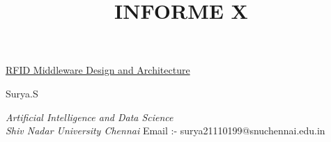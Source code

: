 \documentclass[a4paper,12pt]{article}
\title{INFORME X}
\begin{document}
\begin{center}
\Large\underline{RFID Middleware Design and Architecture}
\vspace{0.4cm}

\normalsize
Surya.S
\vspace{0.1cm}

\textit{\small{Artificial Intelligence and Data Science }\\
\small{Shiv Nadar University Chennai}}
\vspace{0.1cm}
\small{Email :- surya21110199@snuchennai.edu.in}
\medskip

\normalsize

\end{center}

\medskip
\end{document}
